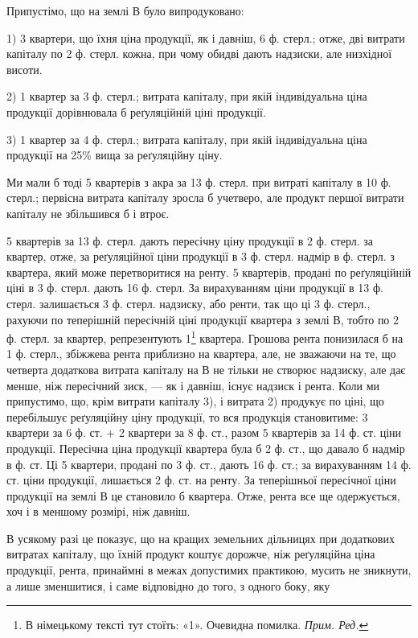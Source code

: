 Припустімо, що на землі $В$ було випродуковано:

1) 3 квартери, що їхня ціна продукції, як і давніш, 6 ф. стерл.; отже,
дві витрати капіталу по  2 ф. стерл. кожна, при чому обидві дають надзиски,
але низхідної висоти.

2) 1 квартер за 3 ф. стерл.; витрата капіталу, при якій індивідуальна
ціна продукції дорівнювала б реґуляційній ціні продукції.

3) 1 квартер за 4 ф. стерл.; витрата капіталу, при якій індивідуальна
ціна продукції на 25\% вища за реґуляційну ціну.

Ми мали б тоді 5 квартерів з акра за 13 ф. стерл. при витраті капіталу
в 10 ф. стерл.; первісна витрата капіталу зросла б учетверо, але продукт
першої витрати капіталу не збільшився б і втроє.

5 квартерів за 13 ф. стерл. дають пересічну ціну продукції в 2 ф. стерл.
за квартер, отже, за реґуляційної ціни продукції в 3 ф. стерл. надмір
в  ф. стерл. з квартера, який може перетворитися на ренту.
5 квартерів, продані по реґуляційній ціні в 3 ф. стерл. дають
16 ф. стерл. За вирахуванням
ціни продукції в 13 ф. стерл. залишається 3 ф. стерл. надзиску, або
ренти, так що ці 3 ф. стерл., рахуючи по теперішній пересічній ціні
продукції квартера з землі $В$, тобто по 2 ф. стерл. за квартер,
репрезентують 1\footnote*{
В німецькому тексті тут стоїть: «1». Очевидна помилка. \emph{Прим. Ред.}
} квартера. Грошова рента понизилася б на 1 ф. стерл., збіжжева
рента приблизно на  квартера, але, не зважаючи на те, що четверта додаткова
витрата капіталу на $В$ не тільки не створює надзиску, але дає менше, ніж
пересічний зиск, — як і давніш, існує надзиск і рента. Коли ми припустимо, що,
крім витрати капіталу 3), і витрата 2) продукує по ціні, що перебільшує реґуляційну
ціну продукції, то вся продукція становитиме: 3 квартери за
6 ф. ст. + 2 квартери за 8 ф. ст., разом 5 квартерів за 14 ф. ст.
ціни продукції. Пересічна ціна продукції квартера була б 2  ф. ст.,
що давало б надмір в  ф. ст. Ці 5  квартери, продані по
3 ф. ст., дають 16 ф. ст.; за вирахуванням
14 ф. ст. ціни продукції, лишається 2 ф. ст. на ренту. За теперішньої
пересічної ціни продукції на землі $В$ це становило б  квартера.
Отже, рента все ще одержується, хоч і в меншому розмірі, ніж давніш.

В усякому разі це показує, що на кращих земельних дільницях при додаткових
витратах капіталу, що їхній продукт коштує дорожче, ніж реґуляційна
ціна продукції, рента, принаймні в межах допустимих практикою, мусить не
зникнути, а лише зменшитися, і саме відповідно до того, з одного боку, яку
\parbreak{}  %

